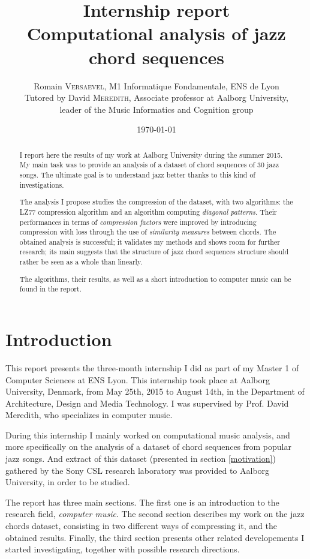 \documentclass[a4paper,10pt]{article}
\title{ \Large Internship report \\ \LARGE Computational analysis of jazz chord sequences}
\author{\normalsize Romain \textsc{Versaevel}, M1 Informatique Fondamentale, ENS de Lyon\\
\normalsize Tutored by David \textsc{Meredith}, Associate professor at Aalborg University,\\
\normalsize leader of the Music Informatics and Cognition group\\}
\date{\today}
\begin{document}
\maketitle

\begin{abstract}
\noindent
I report here the results of my work at Aalborg University during the summer 2015. My main task was to provide an analysis of a dataset of chord sequences of 30 jazz songs. The ultimate goal is to understand jazz better thanks to this kind of investigations.

\noindent
The analysis I propose studies the compression of the dataset, with two algorithms: the LZ77 compression algorithm and an algorithm computing \emph{diagonal patterns}. Their performances in terms of \emph{compression factors} were improved by introducing compression with loss through the use of \emph{similarity measures} between chords. The obtained analysis is successful; it validates my methods and shows room for further research; its main suggests that the structure of jazz chord sequences structure should rather be seen as a whole than linearly.

\noindent
The algorithms, their results, as well as a short introduction to computer music can be found in the report.
\end{abstract}

\newpage
\tableofcontents
\newpage


\section{Introduction}

This report presents the three-month internship I did as part of my Master 1 of Computer Sciences at ENS Lyon. This internship took place at Aalborg University, Denmark, from May 25th, 2015 to August 14th, in the Department of Architecture, Design and Media Technology. I was supervised by Prof. David Meredith, who specializes in computer music.

During this internship I mainly worked on computational music analysis, and more specifically on the analysis of a dataset of chord sequences from popular jazz songs. And extract of this dataset (presented in section \ref{motivation}) gathered by the Sony CSL research laboratory was provided to Aalborg University, in order to be studied.

The report has three main sections.
The first one is an introduction to the research field, \emph{computer music}.
The second section describes my work on the jazz chords dataset, consisting in two different ways of compressing it, and the obtained results.
Finally, the third section presents other related developements I started investigating, together with possible research directions.
\end{document}
